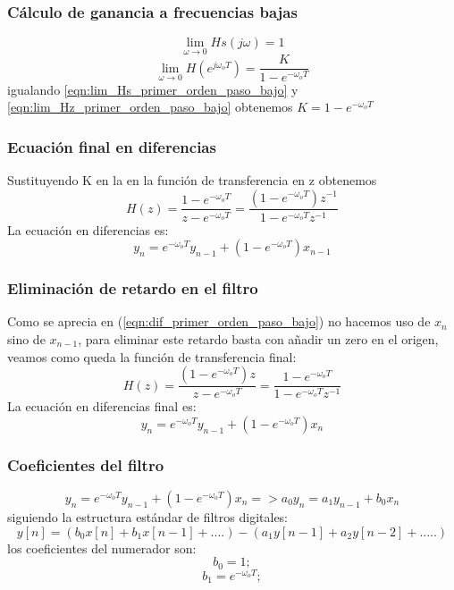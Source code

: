 \documentclass[titlepage]{article}
\begin{document}
\subsubsection{Cálculo de ganancia a frecuencias bajas}
\begin{equation}
\label{eqn:lim_Hs_primer_orden_paso_bajo}\lim_{\omega \to 0}Hs(j\omega)=1
\end{equation}
\begin{equation}
\label{eqn:lim_Hz_primer_orden_paso_bajo}\lim_{\omega \to 0}H(e^{j\omega_oT})=\frac{K}{1-e^{-\omega_oT}}
\end{equation}
\quad igualando \ref{eqn:lim_Hs_primer_orden_paso_bajo} y \ref{eqn:lim_Hz_primer_orden_paso_bajo} obtenemos $K=1-e^{-\omega_oT}$ 
\subsubsection{Ecuación final en diferencias}
Sustituyendo K en la en la función de transferencia en z obtenemos 
\begin{equation}
	H(z)=\frac{1-e^{-\omega_oT}}{z-e^{-\omega_oT}}=\frac{(1-e^{-\omega_oT})z^{-1}}{1-e^{-\omega_oT}z^{-1}} 
\end{equation}
La ecuación en diferencias es:
\begin{equation}
\label{eqn:dif_primer_orden_paso_bajo}y_n=e^{-\omega_oT}y_{n-1}+(1-e^{-\omega_oT})x_{n-1}
\end{equation}
\subsubsection{Eliminación de retardo en el filtro}
Como se aprecia en (\ref{eqn:dif_primer_orden_paso_bajo}) no hacemos uso de $x_n$ sino de $x_{n-1}$, para eliminar este retardo basta con añadir un zero en el origen, veamos como queda la función de transferencia final:
\begin{equation}
	H(z)=\frac{(1-e^{-\omega_oT})z}{z-e^{-\omega_oT}}=\frac{1-e^{-\omega_oT}}{1-e^{-\omega_oT}z^{-1}} 
\end{equation}
La ecuación en diferencias final es:
\begin{equation}
y_n=e^{-\omega_oT}y_{n-1}+(1-e^{-\omega_oT})x_{n}
\end{equation}
\subsubsection{Coeficientes del filtro}
\begin{equation}
y_n=e^{-\omega_oT}y_{n-1}+(1-e^{-\omega_oT})x_{n} => a_0y_{n}=a_1y_{n-1}+b_0x_n
\end{equation}
siguiendo la estructura estándar de filtros digitales:
\begin{equation}
y[n]=(b_0x[n]+b_1x[n-1]+ ....)-(a_1y[n-1] + a_2y[n-2] + .....)  
\end{equation}
los coeficientes del numerador son:
	\begin{equation}
		b_0=1;
	\end{equation}
	\begin{equation}
		b_1=e^{-\omega_oT};
	\end{equation}
\end{document}
